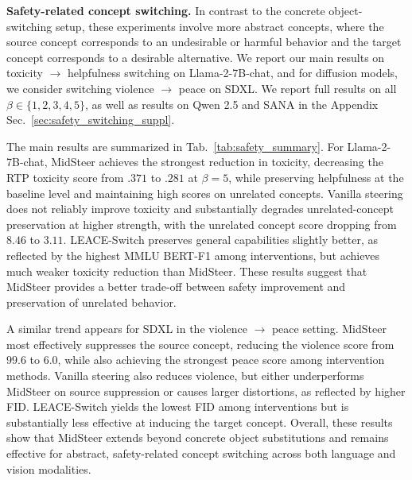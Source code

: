 



\noindent \textbf{Safety-related concept switching.} In contrast to the concrete object-switching setup, these experiments involve more abstract concepts, where the source concept corresponds to an undesirable or harmful behavior and the target concept corresponds to a desirable alternative. 
We report our main results on toxicity $\to$ helpfulness switching on Llama-2-7B-chat, and for diffusion models, we consider switching violence $\to$ peace on SDXL. We report full results on all $\beta \in \{1, 2, 3, 4, 5\}$, as well as results on Qwen 2.5 and SANA in the Appendix Sec.~\ref{sec:safety_switching_suppl}.

The main results are summarized in Tab.~\ref{tab:safety_summary}.
For Llama-2-7B-chat, MidSteer achieves the strongest reduction in toxicity, decreasing the RTP toxicity score from $.371$ to $.281$ at $\beta=5$, while preserving helpfulness at the baseline level and maintaining high scores on unrelated concepts. 
Vanilla steering does not reliably improve toxicity and substantially degrades unrelated-concept preservation at higher strength, with the unrelated concept score dropping from $8.46$ to $3.11$. 
LEACE-Switch preserves general capabilities slightly better, as reflected by the highest MMLU BERT-F1 among interventions, but achieves much weaker toxicity reduction than MidSteer. 
These results suggest that MidSteer provides a better trade-off between safety improvement and preservation of unrelated behavior.

A similar trend appears for SDXL in the violence $\to$ peace setting.  MidSteer most effectively suppresses the source concept, reducing the violence score from $99.6$ to $6.0$, while also achieving the strongest peace score among intervention methods.  Vanilla steering also reduces violence, but either underperforms MidSteer on source suppression or causes larger distortions, as reflected by higher FID. LEACE-Switch yields the lowest FID among interventions but is substantially less effective at inducing the target concept. 
Overall, these results show that MidSteer extends beyond concrete object substitutions and remains effective for abstract, safety-related concept switching across both language and vision modalities.
